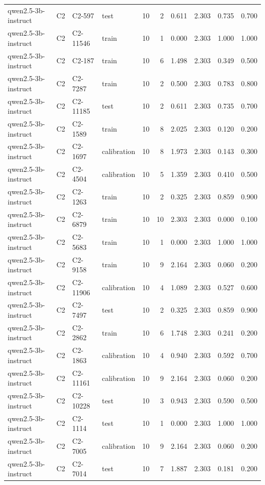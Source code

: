 \begin{table}
\begin{tabular}{llllrrrrrr}
qwen2.5-3b-instruct & C2 & C2-597 & test & 10 & 2 & 0.611 & 2.303 & 0.735 & 0.700 \\
qwen2.5-3b-instruct & C2 & C2-11546 & train & 10 & 1 & 0.000 & 2.303 & 1.000 & 1.000 \\
qwen2.5-3b-instruct & C2 & C2-187 & train & 10 & 6 & 1.498 & 2.303 & 0.349 & 0.500 \\
qwen2.5-3b-instruct & C2 & C2-7287 & train & 10 & 2 & 0.500 & 2.303 & 0.783 & 0.800 \\
qwen2.5-3b-instruct & C2 & C2-11185 & test & 10 & 2 & 0.611 & 2.303 & 0.735 & 0.700 \\
qwen2.5-3b-instruct & C2 & C2-1589 & train & 10 & 8 & 2.025 & 2.303 & 0.120 & 0.200 \\
qwen2.5-3b-instruct & C2 & C2-1697 & calibration & 10 & 8 & 1.973 & 2.303 & 0.143 & 0.300 \\
qwen2.5-3b-instruct & C2 & C2-4504 & calibration & 10 & 5 & 1.359 & 2.303 & 0.410 & 0.500 \\
qwen2.5-3b-instruct & C2 & C2-1263 & train & 10 & 2 & 0.325 & 2.303 & 0.859 & 0.900 \\
qwen2.5-3b-instruct & C2 & C2-6879 & train & 10 & 10 & 2.303 & 2.303 & 0.000 & 0.100 \\
qwen2.5-3b-instruct & C2 & C2-5683 & train & 10 & 1 & 0.000 & 2.303 & 1.000 & 1.000 \\
qwen2.5-3b-instruct & C2 & C2-9158 & train & 10 & 9 & 2.164 & 2.303 & 0.060 & 0.200 \\
qwen2.5-3b-instruct & C2 & C2-11906 & calibration & 10 & 4 & 1.089 & 2.303 & 0.527 & 0.600 \\
qwen2.5-3b-instruct & C2 & C2-7497 & test & 10 & 2 & 0.325 & 2.303 & 0.859 & 0.900 \\
qwen2.5-3b-instruct & C2 & C2-2862 & train & 10 & 6 & 1.748 & 2.303 & 0.241 & 0.200 \\
qwen2.5-3b-instruct & C2 & C2-1863 & calibration & 10 & 4 & 0.940 & 2.303 & 0.592 & 0.700 \\
qwen2.5-3b-instruct & C2 & C2-11161 & calibration & 10 & 9 & 2.164 & 2.303 & 0.060 & 0.200 \\
qwen2.5-3b-instruct & C2 & C2-10228 & test & 10 & 3 & 0.943 & 2.303 & 0.590 & 0.500 \\
qwen2.5-3b-instruct & C2 & C2-1114 & test & 10 & 1 & 0.000 & 2.303 & 1.000 & 1.000 \\
qwen2.5-3b-instruct & C2 & C2-7005 & calibration & 10 & 9 & 2.164 & 2.303 & 0.060 & 0.200 \\
qwen2.5-3b-instruct & C2 & C2-7014 & test & 10 & 7 & 1.887 & 2.303 & 0.181 & 0.200 \\

\end{tabular}
\end{table}

